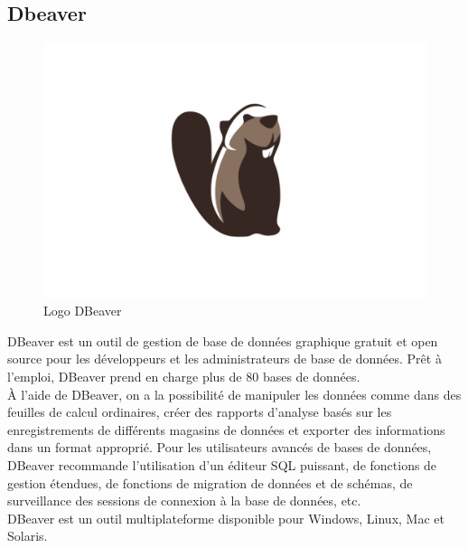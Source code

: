     \subsection{Dbeaver}
    \begin{figure}[H]
        \centering
        \includegraphics[scale=0.1]{ACR/DBeaver-Logo.png}
        \caption{Logo DBeaver}
    \end{figure}
    
    DBeaver\cite{dbeaver} est un outil de gestion de base de données graphique gratuit et open source pour les développeurs et les administrateurs de base de données. Prêt à l'emploi, DBeaver prend en charge plus de 80 bases de données.\\
    
    À l'aide de DBeaver, on a la possibilité de manipuler les données comme dans des feuilles de calcul ordinaires, créer des rapports d'analyse basés sur les enregistrements de différents magasins de données et exporter des informations dans un format approprié. Pour les utilisateurs avancés de bases de données, DBeaver recommande l'utilisation d'un éditeur SQL puissant, de fonctions de gestion étendues, de fonctions de migration de données et de schémas, de surveillance des sessions de connexion à la base de données, etc.\\
    
    DBeaver est un outil multiplateforme disponible pour Windows, Linux, Mac et Solaris.\\

